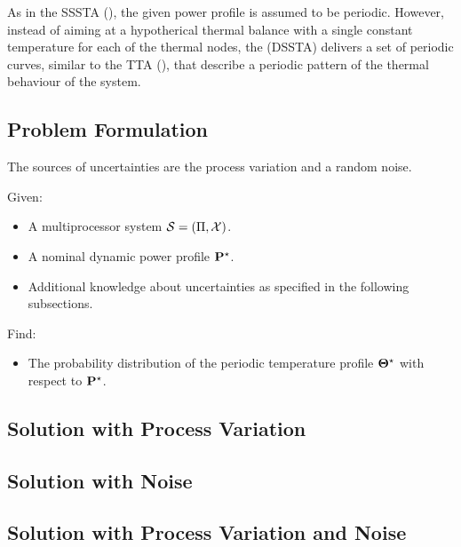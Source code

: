 As in the SSSTA (), the given power profile is assumed to be periodic. However, instead of aiming at a hypotherical thermal balance with a single constant temperature for each of the thermal nodes, the  (DSSTA) delivers a set of periodic curves, similar to the TTA (), that describe a periodic pattern of the thermal behaviour of the system.

\subsection{Problem Formulation}
The sources of uncertainties are the process variation and a random noise.

Given:
\begin{itemize}
  \item A multiprocessor system $\mathcal{S} = (\Pi, \mathcal{X})$.
  \item A nominal dynamic power profile $\mathbf{P}^\star$.
  \item Additional knowledge about uncertainties as specified in the following subsections.
\end{itemize}

Find:
\begin{itemize}
  \item The probability distribution of the periodic temperature profile $\mathbf{\Theta}^\star$ with respect to $\mathbf{P}^\star$.
\end{itemize}

\subsection{Solution with Process Variation} 


\subsection{Solution with Noise} 


\subsection{Solution with Process Variation and Noise} 

